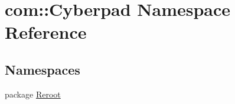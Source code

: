 \hypertarget{namespacecom_1_1_cyberpad}{
\section{com\-:\-:\-Cyberpad \-Namespace \-Reference}
\label{namespacecom_1_1_cyberpad}
}
\subsection*{\-Namespaces}
\begin{DoxyCompactItemize}
\item 
package \hyperlink{namespacecom_1_1_cyberpad_1_1_reroot}{\-Reroot}
\end{DoxyCompactItemize}
